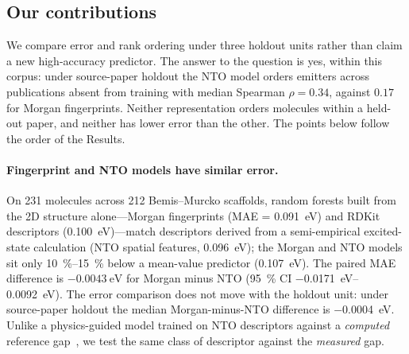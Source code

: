 \subsection{Our contributions}

We compare error and rank ordering under three holdout units rather than claim a
new high-accuracy predictor. The answer to the question is yes, within this
corpus: under source-paper holdout the NTO model orders emitters across
publications absent from training with median Spearman $\rho = 0.34$, against
$0.17$ for Morgan fingerprints. Neither representation orders molecules within a
held-out paper, and neither has lower error than the other. The points below
follow the order of the Results.

\paragraph{Fingerprint and NTO models have similar error.}
On \num{231} molecules across \num{212} Bemis--Murcko scaffolds, random forests built
from the 2D structure alone---Morgan fingerprints (MAE = \qty{0.091}{\electronvolt}) and
RDKit descriptors (\qty{0.100}{\electronvolt})---match descriptors derived from a
semi-empirical excited-state calculation (NTO spatial features,
\qty{0.096}{\electronvolt}); the Morgan and NTO models sit only \qtyrange{10}{15}{\percent}
below a mean-value predictor (\qty{0.107}{\electronvolt}). The paired MAE difference is $-\qty{0.0043}{\electronvolt}$ for Morgan minus NTO
(\qty{95}{\percent} CI \qtyrange{-0.0171}{+0.0092}{\electronvolt}). The error
comparison does not move with the holdout unit: under source-paper holdout the
median Morgan-minus-NTO difference is \qty{-0.0004}{\electronvolt}. Unlike a
physics-guided model trained on NTO descriptors against a \emph{computed} reference
gap~\cite{Das2025}, we test the same class of descriptor against the
\emph{measured} gap.

